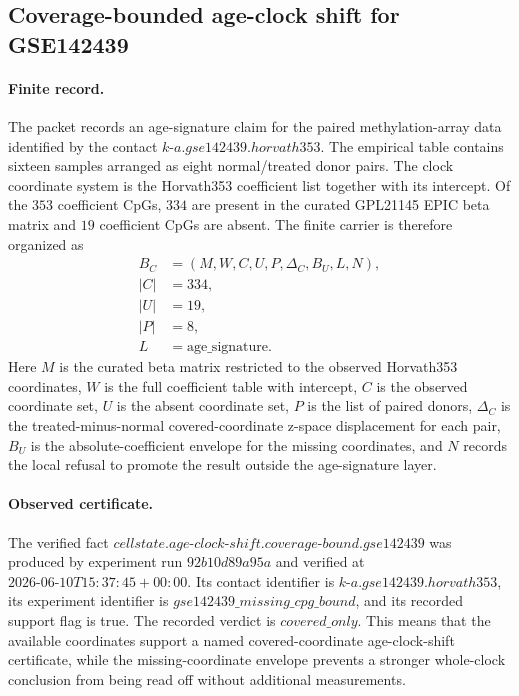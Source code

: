 \subsection{Coverage-bounded age-clock shift for GSE142439}
\label{sec:age-clock-shift-coverage-bound-gse142439}

\paragraph{Finite record.}
The packet records an age-signature claim for the paired methylation-array data identified by the contact $k\text{-}a.gse142439.horvath353$.  The empirical table contains sixteen samples arranged as eight normal/treated donor pairs.  The clock coordinate system is the Horvath353 coefficient list together with its intercept.  Of the $353$ coefficient CpGs, $334$ are present in the curated GPL21145 EPIC beta matrix and $19$ coefficient CpGs are absent.  The finite carrier is therefore organized as
$$
\begin{aligned}
B_C &= (M,W,C,U,P,\Delta_C,B_U,L,N),\\
|C| &= 334,\\
|U| &= 19,\\
|P| &= 8,\\
L &= \mathrm{age\_signature}.
\end{aligned}
$$
Here $M$ is the curated beta matrix restricted to the observed Horvath353 coordinates, $W$ is the full coefficient table with intercept, $C$ is the observed coordinate set, $U$ is the absent coordinate set, $P$ is the list of paired donors, $\Delta_C$ is the treated-minus-normal covered-coordinate z-space displacement for each pair, $B_U$ is the absolute-coefficient envelope for the missing coordinates, and $N$ records the local refusal to promote the result outside the age-signature layer.

\paragraph{Observed certificate.}
The verified fact $cellstate.age\text{-}clock\text{-}shift.coverage\text{-}bound.gse142439$ was produced by experiment run $92b10d89a95a$ and verified at $2026\text{-}06\text{-}10T15{:}37{:}45+00{:}00$.  Its contact identifier is $k\text{-}a.gse142439.horvath353$, its experiment identifier is $gse142439\_missing\_cpg\_bound$, and its recorded support flag is true.  The recorded verdict is $covered\_only$.  This means that the available coordinates support a named covered-coordinate age-clock-shift certificate, while the missing-coordinate envelope prevents a stronger whole-clock conclusion from being read off without additional measurements.

